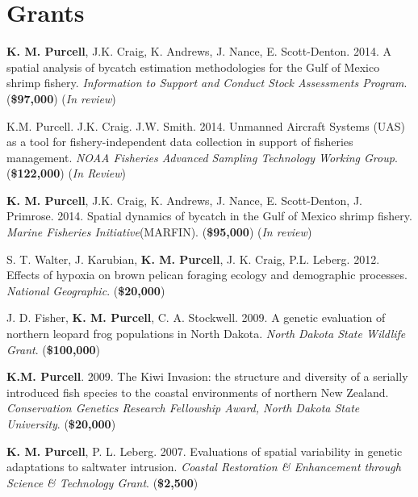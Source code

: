 \documentclass[letterpaper]{article}
\renewenvironment{itemize}{
  \begin{list}{}{
    \setlength{\leftmargin}{1em}
  }
}{
  \end{list}
}
\begin{document}
\section*{Grants}
	\begin{itemize}
		 \item \textbf{K. M. Purcell}, J.K. Craig, K. Andrews, J. Nance, E. Scott-Denton. 2014. A spatial analysis of bycatch estimation methodologies for the Gulf of Mexico shrimp fishery. \textit{Information to Support and Conduct Stock Assessments Program}. (\textbf{\$97,000}) (\textit{In review})
		 \item K.M. Purcell. J.K. Craig. J.W. Smith.  2014.  Unmanned Aircraft Systems (UAS) as a tool for fishery-independent data collection in support of fisheries management.  \textit{NOAA Fisheries Advanced Sampling Technology Working Group}. (\textbf{\$122,000}) (\textit{In Review})
		 \item \textbf{K. M. Purcell}, J.K. Craig, K. Andrews, J. Nance, E. Scott-Denton, J. Primrose. 2014. Spatial dynamics of bycatch in the Gulf of Mexico shrimp fishery. \textit{Marine Fisheries Initiative}(MARFIN). (\textbf{\$95,000}) (\textit{In review})
		 \item S. T. Walter, J. Karubian, \textbf{K. M. Purcell}, J. K. Craig, P.L. Leberg. 2012. Effects of hypoxia on brown pelican foraging ecology and demographic processes. \textit{National Geographic}. (\textbf{\$20,000})
		 \item J. D. Fisher, \textbf{K. M. Purcell}, C. A. Stockwell. 2009. A genetic evaluation of northern leopard frog populations in North Dakota. \textit{North Dakota State Wildlife Grant}. (\textbf{\$100,000})
		 \item \textbf{K.M. Purcell}. 2009. The Kiwi Invasion: the structure and diversity of a serially introduced fish species to the coastal environments of northern New Zealand. \textit{Conservation Genetics Research Fellowship Award, North Dakota State University}. (\textbf{\$20,000})
		 \item \textbf{K. M. Purcell}, P. L. Leberg. 2007. Evaluations of spatial variability in genetic adaptations to saltwater intrusion. \textit{Coastal Restoration & Enhancement through Science & Technology Grant}. (\textbf{\$2,500})
	\end{itemize}
\end{document}
